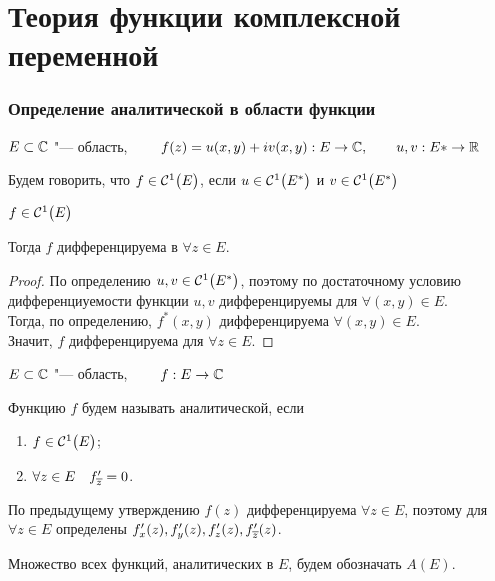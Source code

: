 \part{Теория функции комплексной переменной}

\section{Определение аналитической в области функции}

\begin{definition}
	$ E \sub \Co $ "--- область, $ \qquad f(z) = u(x, y) + iv(x, y) : E \to \Co, \qquad u, v : E* \to \R $

	Будем говорить, что $ f \in \Cont[1] E $, если $ u \in \Cont[1]{E^*} $ и $ v \in \Cont[1]{E^*} $
\end{definition}

\begin{statement}
	$ f \in \Cont[1] E $

	Тогда $ f $ дифференцируема в $ \forall z \in E $.
\end{statement}

\begin{proof}
	По определению $ u, v \in \Cont[1]{E^*} $, поэтому по достаточному условию дифференциуемости функции $ u, v $ дифференцируемы для $ \forall (x, y) \in E $. \\
	Тогда, по определению, $ f^*(x, y) $ дифференцируема $ \forall (x, y) \in E $. \\
	Значит, $ f $ дифференцируема для $ \forall z \in E $.
\end{proof}

\begin{definition}
	$ E \sub \Co $ "--- область, $ \qquad f : E \to \Co $

	Функцию $ f $ будем называть аналитической, если
	\begin{enumerate}
		\item $ f \in \Cont[1]E $;
		\item $ \forall z \in E \quad f_{\ol z}' = 0 $.
	\end{enumerate}
\end{definition}

\begin{remark}
	По предыдущему утверждению $ f(z) $ дифференцируема $ \forall z \in E $, поэтому для $ \forall z \in E $ определены $ f_x'(z), f_y'(z), f_z'(z), f_{\ol z}'(z) $.
\end{remark}

\begin{notation}
	Множество всех функций, аналитических в $ E $, будем обозначать $ A(E) $.
\end{notation}

